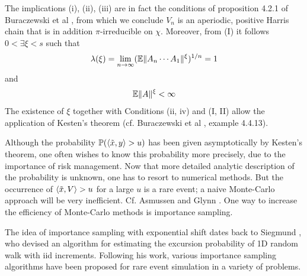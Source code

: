 \documentclass[aoas,preprint]{imsart}
\numberwithin{equation}{section}
\theoremstyle{plain}
\begin{document}
The implications (i), (ii), (iii) are in fact the conditions of
proposition 4.2.1 of Buraczewski et al
\cite{buraczewski:damek:mikosch:2016}, from which we conclude $V_n$ is
an aperiodic, positive Harris chain that is in addition
$\pi$-irreducible on $\chi$.
Moreover, from (I) it follows $0 < \exists \xi < s$ such that
\begin{equation}
  \label{eq:hyt}
  \lambda(\xi) = \lim_{n \to \infty} (\mathbb{E} \|A_n \cdots A_1\|^\xi)^{1/n} = 1
\end{equation}
and
\begin{equation}
  \label{eq:jui}
  \mathbb{E} \|A\|^\xi < \infty
\end{equation}
The existence of $\xi$ together with Conditions (ii, iv) and (I, II)
allow the application of Kesten's theorem (cf. Buraczewski et al
\cite{buraczewski:damek:mikosch:2016}, example 4.4.13).

Although the probability $\mathbb{P}(\langle\tilde x, y\rangle > u)$ has been given
asymptotically by Kesten's theorem, one often wishes to know
this probability more precisely, due to the importance of risk
management. Now that more detailed analytic description of the
probability is unknown, one has to resort to numerical methods. But
the occurrence of $\langle\tilde x, V\rangle > u$ for a large $u$ is a rare event; a
naive Monte-Carlo approach will be very inefficient. Cf. Asmussen and
Glynn \cite{opac-b1123521}.
One way to increase the efficiency of Monte-Carlo methods is
importance sampling.

The idea of importance sampling with exponential shift dates back
to Siegmund \cite{siegmund:1976}, who devised an algorithm for
estimating the excursion probability of 1D random walk with iid
increments. Following his work, various importance sampling algorithms
have been proposed for rare event simulation in a variety of problems.
\end{document}
